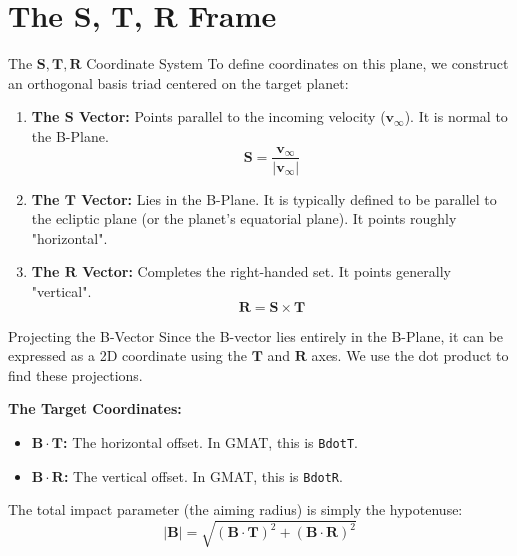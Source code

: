\documentclass[11pt]{beamer}
\begin{document}
\section{The S, T, R Frame}

\begin{frame}{The $\bm{S}, \bm{T}, \bm{R}$ Coordinate System}
    To define coordinates on this plane, we construct an orthogonal basis triad centered on the target planet:
    
    \begin{enumerate}
        \item \textbf{The $\bm{S}$ Vector:} Points parallel to the incoming velocity ($\bm{v}_\infty$). It is normal to the B-Plane.
        $$ \bm{S} = \frac{\bm{v}_\infty}{|\bm{v}_\infty|} $$
        \item \textbf{The $\bm{T}$ Vector:} Lies in the B-Plane. It is typically defined to be parallel to the ecliptic plane (or the planet's equatorial plane). It points roughly "horizontal".
        \item \textbf{The $\bm{R}$ Vector:} Completes the right-handed set. It points generally "vertical".
        $$ \bm{R} = \bm{S} \times \bm{T} $$
    \end{enumerate}
\end{frame}

\begin{frame}{Projecting the B-Vector}
    Since the B-vector lies entirely in the B-Plane, it can be expressed as a 2D coordinate using the $\bm{T}$ and $\bm{R}$ axes. We use the dot product to find these projections.
    
    \vspace{0.3cm}
    \textbf{The Target Coordinates:}
    \begin{itemize}
        \item \textbf{$\bm{B \cdot T}$:} The horizontal offset. In GMAT, this is \texttt{BdotT}.
        \item \textbf{$\bm{B \cdot R}$:} The vertical offset. In GMAT, this is \texttt{BdotR}.
    \end{itemize}
    
    \vspace{0.3cm}
    The total impact parameter (the aiming radius) is simply the hypotenuse:
    $$ |\bm{B}| = \sqrt{(\bm{B \cdot T})^2 + (\bm{B \cdot R})^2} $$
\end{frame}

\end{document}
